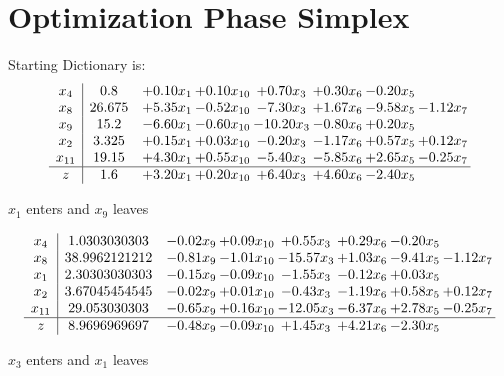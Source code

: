 \documentclass[9pt]{article}
\begin{document}
\section{Optimization Phase Simplex}
Starting Dictionary is:
\[\begin{array}{c| c c@{\hskip 2pt} c@{\hskip 2pt} c@{\hskip 2pt} c@{\hskip 2pt} c@{\hskip 2pt} c@{\hskip 2pt} }
 x_{4}   &  0.8 & +  0.10 x_{1} & +  0.10 x_{10} & +  0.70 x_{3} & +  0.30 x_{6} & -0.20 x_{5} &   \\
 x_{8}   &  26.675 & +  5.35 x_{1} & -0.52 x_{10} & -7.30 x_{3} & +  1.67 x_{6} & -9.58 x_{5} & -1.12 x_{7}\\
 x_{9}   &  15.2 & -6.60 x_{1} & -0.60 x_{10} & -10.20 x_{3} & -0.80 x_{6} & +  0.20 x_{5} &   \\
 x_{2}   &  3.325 & +  0.15 x_{1} & +  0.03 x_{10} & -0.20 x_{3} & -1.17 x_{6} & +  0.57 x_{5} & +  0.12 x_{7}\\
 x_{11}   &  19.15 & +  4.30 x_{1} & +  0.55 x_{10} & -5.40 x_{3} & -5.85 x_{6} & +  2.65 x_{5} & -0.25 x_{7}\\
\hline
z    &  1.6 & +  3.20 x_{1} & +  0.20 x_{10} & +  6.40 x_{3} & +  4.60 x_{6} & -2.40 x_{5} &   \\
\end{array}\]


 $ x_{1} $ enters and $ x_{9} $ leaves 

 \[\begin{array}{c| c c@{\hskip 2pt} c@{\hskip 2pt} c@{\hskip 2pt} c@{\hskip 2pt} c@{\hskip 2pt} c@{\hskip 2pt} }
 x_{4}   &  1.0303030303 & -0.02 x_{9} & +  0.09 x_{10} & +  0.55 x_{3} & +  0.29 x_{6} & -0.20 x_{5} &   \\
 x_{8}   &  38.9962121212 & -0.81 x_{9} & -1.01 x_{10} & -15.57 x_{3} & +  1.03 x_{6} & -9.41 x_{5} & -1.12 x_{7}\\
 x_{1}   &  2.30303030303 & -0.15 x_{9} & -0.09 x_{10} & -1.55 x_{3} & -0.12 x_{6} & +  0.03 x_{5} &   \\
 x_{2}   &  3.67045454545 & -0.02 x_{9} & +  0.01 x_{10} & -0.43 x_{3} & -1.19 x_{6} & +  0.58 x_{5} & +  0.12 x_{7}\\
 x_{11}   &  29.053030303 & -0.65 x_{9} & +  0.16 x_{10} & -12.05 x_{3} & -6.37 x_{6} & +  2.78 x_{5} & -0.25 x_{7}\\
\hline
z    &  8.9696969697 & -0.48 x_{9} & -0.09 x_{10} & +  1.45 x_{3} & +  4.21 x_{6} & -2.30 x_{5} &   \\
\end{array}\]


 $ x_{3} $ enters and $ x_{1} $ leaves 
\end{document}
